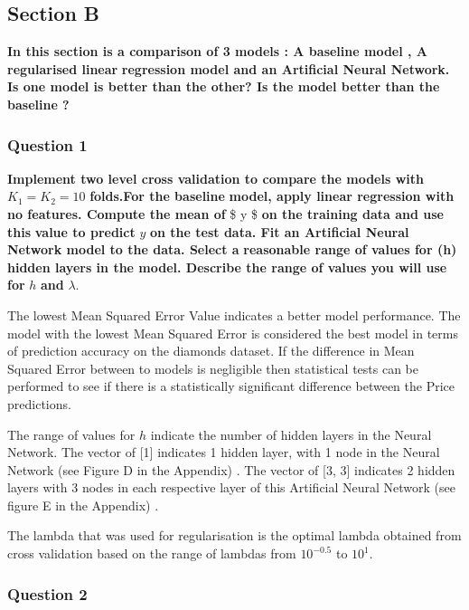 \documentclass[
]{article}
\begin{document}
\hypertarget{section-b}{%
\subsection{Section B}\label{section-b}}

\textbf{In this section is a comparison of 3 models : A baseline model ,
A regularised linear} \textbf{regression model and an Artificial Neural
Network.} \textbf{Is one model is better than the other? Is the model
better than the baseline ?}

\hypertarget{question-1-1}{%
\subsubsection{Question 1}\label{question-1-1}}

\textbf{Implement two level cross validation to compare the models with}
\(K_{1} = K_{2} = 10\) \textbf{folds.For the baseline} \textbf{model,
apply linear regression with no features. Compute the mean of }\$ y \$
\textbf{on the training data and use this} \textbf{value to predict}
\(y\) \textbf{on the test data. Fit an Artificial Neural Network model
to the data. Select a} \textbf{reasonable range of values for (h) hidden
layers in the model. Describe the range of values you will use}
\textbf{for }\(h\) \textbf{and }\(\lambda\).

The lowest Mean Squared Error Value indicates a better model
performance. The model with the lowest Mean Squared Error is considered
the best model in terms of prediction accuracy on the diamonds dataset.
If the difference in Mean Squared Error between to models is negligible
then statistical tests can be performed to see if there is a
statistically significant difference between the Price predictions.

The range of values for \(h\) indicate the number of hidden layers in
the Neural Network. The vector of {[}1{]} indicates 1 hidden layer, with
1 node in the Neural Network (see Figure D in the Appendix) . The vector
of {[}3, 3{]} indicates 2 hidden layers with 3 nodes in each respective
layer of this Artificial Neural Network (see figure E in the Appendix) .

The lambda that was used for regularisation is the optimal lambda
obtained from cross validation based on the range of lambdas from
\(10^{-0.5}\) to \(10^{1}\).

\hypertarget{question-2-1}{%
\subsubsection{Question 2}\label{question-2-1}}
\end{document}
